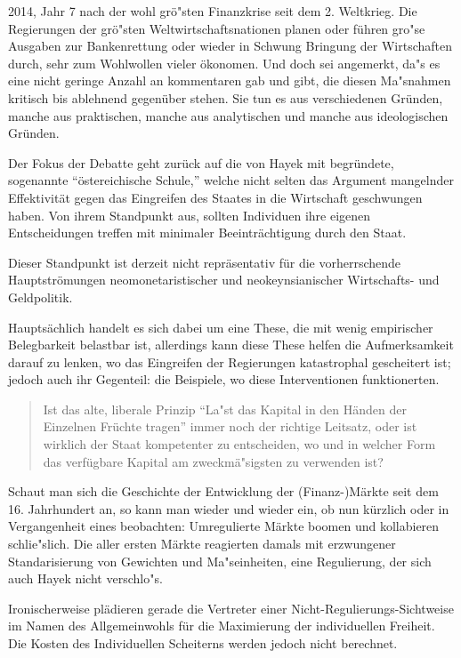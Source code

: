 \documentclass[
    onecolumn,
    a4paper,
    abstracton,
    parskip=half
    ,final
    ]{scrartcl}
\begin{document}
2014, Jahr 7 nach der wohl gr{\"o}{"s}ten Finanzkrise seit dem 2. Weltkrieg. Die Regierungen der gr{\"o}{"s}ten Weltwirtschaftsnationen planen oder f{\"u}hren gro{"s}e Ausgaben zur Bankenrettung oder wieder in Schwung Bringung der Wirtschaften durch, sehr zum Wohlwollen vieler {\"o}konomen. Und doch sei angemerkt, da{"s} es eine nicht geringe Anzahl an kommentaren gab und gibt, die diesen Ma{"s}nahmen kritisch bis ablehnend gegen{\"u}ber stehen. Sie tun es aus verschiedenen Gr{\"u}nden, manche aus praktischen, manche aus analytischen und manche aus ideologischen Gr{\"u}nden.

Der Fokus der Debatte geht zur{\"u}ck auf die von Hayek mit begr{\"u}ndete, sogenannte "`{\"o}stereichische Schule,"' welche nicht selten das Argument mangelnder Effektivit{\"a}t gegen das Eingreifen des Staates in die Wirtschaft geschwungen haben. Von ihrem Standpunkt aus, sollten Individuen ihre eigenen Entscheidungen treffen mit minimaler Beeintr{\"a}chtigung durch den Staat.

Dieser Standpunkt ist derzeit nicht repr{\"a}sentativ f{\"u}r die vorherrschende Hauptstr{\"o}mungen neomonetaristischer und neokeynsianischer Wirtschafts- und Geldpolitik.

Haupts{\"a}chlich handelt es sich dabei um eine These, die mit wenig empirischer Belegbarkeit belastbar ist, allerdings kann diese These helfen die Aufmerksamkeit darauf zu lenken, wo das Eingreifen der Regierungen katastrophal gescheitert ist; jedoch auch ihr Gegenteil: die Beispiele, wo diese Interventionen funktionerten.

\begin{quote}
Ist das alte, liberale Prinzip "`La{"s}t das Kapital in den H{\"a}nden der Einzelnen Fr{\"u}chte tragen"' immer noch der richtige Leitsatz,
 oder ist wirklich der Staat kompetenter zu entscheiden, wo und in welcher Form das verf{\"u}gbare Kapital am zweckm{\"a}{"s}igsten zu verwenden ist? \citep[S.23f]{Hayek1969}
\end{quote}

Schaut man sich die Geschichte der Entwicklung der (Finanz-)M{\"a}rkte seit dem 16. Jahrhundert an, so kann man wieder und wieder ein, ob nun k{\"u}rzlich oder in Vergangenheit eines beobachten: Umregulierte M{\"a}rkte boomen und kollabieren schlie{"s}lich. Die aller ersten M{\"a}rkte reagierten damals mit erzwungener Standarisierung von Gewichten und Ma{"s}einheiten, eine Regulierung, der sich auch Hayek nicht verschlo{"s}.

Ironischerweise pl{\"a}dieren gerade die Vertreter einer Nicht-Regulierungs-Sichtweise im Namen des Allgemeinwohls f{\"u}r die Maximierung der individuellen Freiheit. Die Kosten des Individuellen Scheiterns werden jedoch nicht berechnet.
\end{document}
